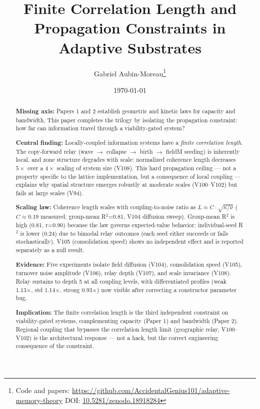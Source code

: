 \documentclass[11pt]{article}
\title{Finite Correlation Length and Propagation Constraints in Adaptive Substrates}
\author{Gabriel Aubin-Moreau\thanks{Code and papers: \url{https://github.com/AccidentalGenius101/adaptive-memory-theory} \quad DOI: \href{https://doi.org/10.5281/zenodo.18918284}{10.5281/zenodo.18918284}}}
\date{\today}
\begin{document}
\maketitle

\begin{abstract}
\noindent\textbf{Missing axis:} Papers 1 and 2 establish geometric and kinetic laws for capacity and bandwidth. This paper completes the trilogy by isolating the propagation constraint: how far can information travel through a viability-gated system?

\noindent\textbf{Central finding:} Locally-coupled information systems have a \emph{finite correlation length}. The copy-forward relay (wave $\to$ collapse $\to$ birth $\to$ fieldM seeding) is inherently local, and zone structure degrades with scale: normalized coherence length decreases $5\times$ over a $4\times$ scaling of system size (V108). This hard propagation ceiling — not a property specific to the lattice implementation, but a consequence of local coupling — explains why spatial structure emerges robustly at moderate scales (V100--V102) but fails at large scales (V94).

\noindent\textbf{Scaling law:} Coherence length scales with coupling-to-noise ratio as $L \approx C \cdot \sqrt{\kappa / \nu}$ ($C \approx 0.19$ measured; group-mean R$^2$=0.81, V104 diffusion sweep). Group-mean R$^2$ is high (0.81, r=0.90) because the law governs expected-value behavior; individual-seed R$^2$ is lower (0.24) due to bimodal relay outcomes (each seed either succeeds or fails stochastically). V105 (consolidation speed) shows no independent effect and is reported separately as a null result.

\noindent\textbf{Evidence:} Five experiments isolate field diffusion (V104), consolidation speed (V105), turnover noise amplitude (V106), relay depth (V107), and scale invariance (V108). Relay sustains to depth 5 at all coupling levels, with differentiated profiles (weak 1.13×, std 1.14×, strong 0.93×) now visible after correcting a constructor parameter bug.

\noindent\textbf{Implication:} The finite correlation length is the third independent constraint on viability-gated systems, complementing capacity (Paper 1) and bandwidth (Paper 2). Regional coupling that bypasses the correlation length limit (geographic relay, V100--V102) is the architectural response — not a hack, but the correct engineering consequence of the constraint.
\end{abstract}
\end{document}
